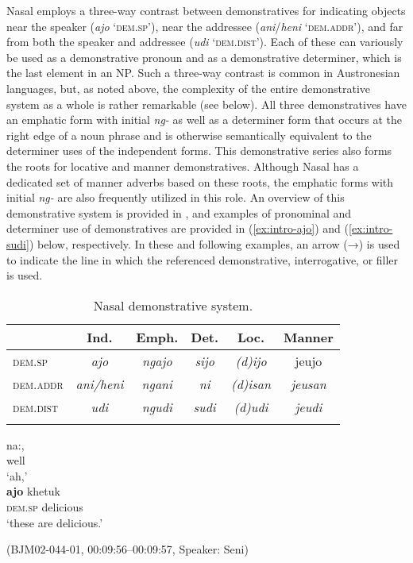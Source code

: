 \documentclass[output=paper,colorlinks,citecolor=brown
\ChapterDOI{10.5281/zenodo.15697585}
]{langscibook}
\begin{document}
Nasal employs a three-way contrast between demonstratives for indicating objects near the speaker (\textit{ajo} `\textsc{dem.sp}'), near the addressee (\textit{ani}/\textit{heni} `\textsc{dem.addr}'), and far from both the speaker and addressee (\textit{udi} `\textsc{dem.dist}'). Each of these can variously be used as a demonstrative pronoun and as a demonstrative determiner, which is the last element in an NP. Such a three-way contrast is common in Austronesian languages, but, as noted above, the complexity of the entire demonstrative system as a whole is rather remarkable (see  below). All three demonstratives have an emphatic form with initial \textit{ng-} as well as a determiner form that occurs at the right edge of a noun phrase and is otherwise semantically equivalent to the determiner uses of the independent forms. This demonstrative series also forms the roots for locative and manner demonstratives. Although Nasal has a dedicated set of manner adverbs based on these roots, the emphatic forms with initial \textit{ng-} are also frequently utilized in this role. An overview of this demonstrative system is provided in , and examples of pronominal and determiner use of demonstratives are provided in (\ref{ex:intro-ajo}) and (\ref{ex:intro-sudi}) below, respectively. In these and following examples, an arrow (→) is used to indicate the line in which the referenced demonstrative, interrogative, or filler is used.

\begin{table}
    \caption{Nasal demonstrative system.}
    \label{tab:billings:demonstratives}
    \begin{tabularx}{.8\textwidth}{l c c c c c}
        \lsptoprule
        & Ind. & Emph. & Det. & Loc. & Manner \\
        \midrule
        \textsc{dem.sp} & \textit{ajo} & \textit{ngajo} & \textit{sijo} & \textit{(d)ijo} & jeujo \\
        \textsc{dem.addr} & \textit{ani/heni} & \textit{ngani} & \textit{ni} & \textit{(d)isan} & \textit{jeusan} \\
        \textsc{dem.dist} & \textit{udi} & \textit{ngudi} & \textit{sudi} & \textit{(d)udi} & \textit{jeudi} \\
        \lspbottomrule
    \end{tabularx}
\end{table}

\begin{exe}
    \ex\label{ex:intro-ajo} \begin{xlist}[0\quad →A:]
         \gll
        na:, \\
        well \\
        \glt `ah,' \\
         \gll
        \textbf{ajo} khetuk \\
        \textsc{dem.sp} delicious \\
        \glt `these are delicious.' \\
    \end{xlist}
    \hfill (BJM02-044-01, 00:09:56–00:09:57, Speaker: Seni) 
\end{exe}
\end{document}
